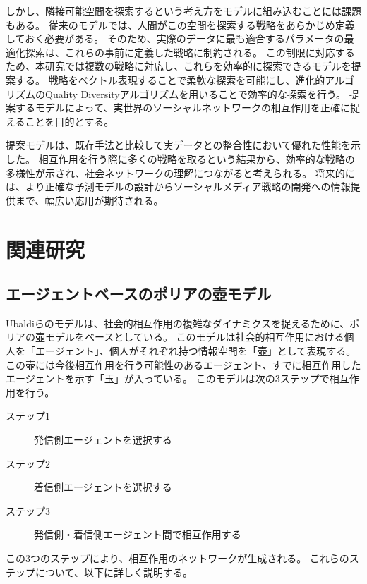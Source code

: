 \documentclass[uplatex,11pt,openany]{ujreport}
\begin{document}
    しかし、隣接可能空間を探索するという考え方をモデルに組み込むことには課題もある。
    従来のモデルでは、人間がこの空間を探索する戦略をあらかじめ定義しておく必要がある。
    そのため、実際のデータに最も適合するパラメータの最適化探索は、これらの事前に定義した戦略に制約される\cite{sudaExplorationExploitationAdjacent2022,sudaAgentbasedModelUsing2022, ubaldiEmergenceEvolutionSocial2021}。
    この制限に対応するため、本研究では複数の戦略に対応し、これらを効率的に探索できるモデルを提案する。
    戦略をベクトル表現することで柔軟な探索を可能にし、進化的アルゴリズムのQuality Diversityアルゴリズムを用いることで効率的な探索を行う。
    提案するモデルによって、実世界のソーシャルネットワークの相互作用を正確に捉えることを目的とする。

    提案モデルは、既存手法と比較して実データとの整合性において優れた性能を示した。
    相互作用を行う際に多くの戦略を取るという結果から、効率的な戦略の多様性が示され、社会ネットワークの理解につながると考えられる。
    将来的には、より正確な予測モデルの設計からソーシャルメディア戦略の開発への情報提供まで、幅広い応用が期待される。





\chapter{関連研究}
    \section{エージェントベースのポリアの壺モデル}
    Ubaldiらのモデルは、社会的相互作用の複雑なダイナミクスを捉えるために、ポリアの壺モデルをベースとしている\cite{ubaldiEmergenceEvolutionSocial2021}。
    このモデルは社会的相互作用における個人を「エージェント」、個人がそれぞれ持つ情報空間を「壺」として表現する。
    この壺には今後相互作用を行う可能性のあるエージェント、すでに相互作用したエージェントを示す「玉」が入っている。
    このモデルは次の3ステップで相互作用を行う。
        \begin{description}
            \item[ステップ1] 発信側エージェントを選択する
            \item[ステップ2] 着信側エージェントを選択する
            \item[ステップ3] 発信側・着信側エージェント間で相互作用する
        \end{description}
    この3つのステップにより、相互作用のネットワークが生成される。
    これらのステップについて、以下に詳しく説明する。
\end{document}
